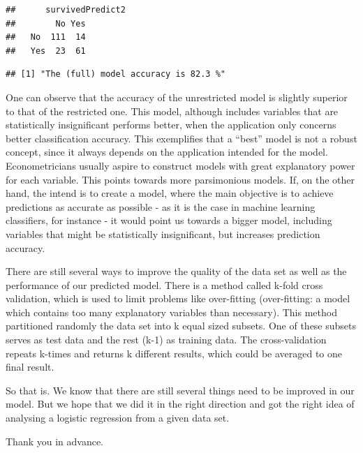 \documentclass[12,]{article}
\newenvironment{Shaded}{\begin{snugshade}}{\end{snugshade}}
\newcommand{\KeywordTok}[1]{\textcolor[rgb]{0.13,0.29,0.53}{\textbf{#1}}}
\newcommand{\DataTypeTok}[1]{\textcolor[rgb]{0.13,0.29,0.53}{#1}}
\newcommand{\DecValTok}[1]{\textcolor[rgb]{0.00,0.00,0.81}{#1}}
\newcommand{\StringTok}[1]{\textcolor[rgb]{0.31,0.60,0.02}{#1}}
\newcommand{\CommentTok}[1]{\textcolor[rgb]{0.56,0.35,0.01}{\textit{#1}}}
\newcommand{\OperatorTok}[1]{\textcolor[rgb]{0.81,0.36,0.00}{\textbf{#1}}}
\newcommand{\NormalTok}[1]{#1}
\begin{document}
\begin{verbatim}
##      survivedPredict2
##        No Yes
##   No  111  14
##   Yes  23  61
\end{verbatim}

\begin{Shaded}
\end{Shaded}

\begin{verbatim}
## [1] "The (full) model accuracy is 82.3 %"
\end{verbatim}

One can observe that the accuracy of the unrestricted model is slightly
superior to that of the restricted one. This model, although includes
variables that are statistically insignificant performs better, when the
application only concerns better classification accuracy. This
exemplifies that a ``best'' model is not a robust concept, since it
always depends on the application intended for the model.
Econometricians usually aspire to construct models with great
explanatory power for each variable. This points towards more
parsimonious models. If, on the other hand, the intend is to create a
model, where the main objective is to achieve predictions as accurate as
possible - as it is the case in machine learning classifiers, for
instance - it would point us towards a bigger model, including variables
that might be statistically insignificant, but increases prediction
accuracy.

There are still several ways to improve the quality of the data set as
well as the performance of our predicted model. There is a method called
k-fold cross validation, which is used to limit problems like
over-fitting (over-fitting: a model which contains too many explanatory
variables than necessary). This method partitioned randomly the data set
into k equal sized subsets. One of these subsets serves as test data and
the rest (k-1) as training data. The cross-validation repeats k-times
and returns k different results, which could be averaged to one final
result.

So that is. We know that there are still several things need to be
improved in our model. But we hope that we did it in the right direction
and got the right idea of analysing a logistic regression from a given
data set.

Thank you in advance.
\end{document}
